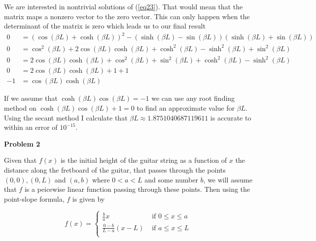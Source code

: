 \documentclass[12pt]{article}
\newcommand{\problem}[1]{\hspace{-4 ex} \large \textbf{Problem #1} }
\begin{document}
	We are interested in nontrivial solutions of (\ref{eq23}). That would mean that the matrix maps a nonzero vector to the zero vector. This can only happen when the determinant of the matrix is zero which leads us to our final result
	\begin{align*}
		0 & = (\cos(\beta L) + \cosh(\beta L))^2 - (\sinh(\beta L) - \sin(\beta L))(\sinh(\beta L) + \sin(\beta L)) \\
		0 & = \cos^2(\beta L) + 2\cos(\beta L)\cosh(\beta L) + \cosh^2(\beta L) - \sinh^2(\beta L) + \sin^2(\beta L) \\
		0 & = 2\cos(\beta L)\cosh(\beta L) + \cos^2(\beta L) + \sin^2(\beta L) + \cosh^2(\beta L) - \sinh^2(\beta L) \\
		0 & = 2\cos(\beta L)\cosh(\beta L) + 1 + 1 \\ 
		-1 & = \cos(\beta L)\cosh(\beta L)
	\end{align*}
	
	If we assume that $\cosh(\beta L) \cos(\beta L) = -1$ we can use any root finding method on $\cosh(\beta L) \cos(\beta L) +1 = 0$ to find an approximate value for $\beta L$. Using the secant method I calculate that $\beta L \approx 1.8751040687119611$ is accurate to within an error of $10^{-15}$. 
	
\problem{2}

	Given that $f(x)$ is the initial height of the guitar string as a function of $x$ the distance along the fretboard of the guitar, that passes through the points $(0,0), (0,L)$ and $(a,b)$ where $0 < a < L$ and some number $b$, we will assume that $f$ is a peicewise linear function passing through these points. Then using the point-slope formula, $f$ is given by
	
	$$
	f(x) =
	\begin{cases}
	\frac{b}{a}x & \text{ if } 0 \leq x \leq a \\
	\frac{0-b}{L-a}(x-L) & \text{ if } a \leq x \leq L \\
	\end{cases}
	$$
	
\end{document}
